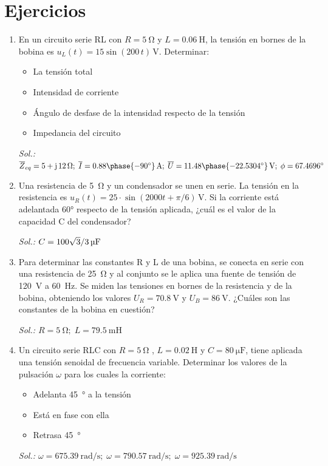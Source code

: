 \section*{Ejercicios}
	
\begin{enumerate}
		
\item En un circuito serie RL con $R=\qty{5}{\ohm}$ y $L=\qty{0.06}{\henry}$, la tensión en bornes de la bobina es $u_L(t)=15\sin(200\,t)\,\si{\volt}$. Determinar:
    \begin{itemize}
    \item La tensión total
    \item Intensidad de corriente
    \item Ángulo de desfase de la intensidad respecto de la tensión
    \item Impedancia del circuito
    \end{itemize}
  \emph{Sol.:\;
    $\overline{Z}_{eq}=5+\mathrm{j}\,12\,\si{\ohm};\;\overline{I}=0.88\phase{-90^\circ}\,\si{\ampere};\;\overline{U}=11.48\phase{-22.5304^\circ}\,\si{\volt};\; \phi=67.4696^\circ$}

\item Una resistencia de \qty{5}{\ohm} y un condensador se unen en serie. La tensión en la resistencia es $u_R(t) = 25 \cdot \sin(2000t + \pi/6)\,\si{\volt}$. Si la corriente está adelantada \ang{60} respecto de la tensión aplicada, ¿cuál es el valor de la capacidad C del condensador?

\emph{Sol.:\;
    $C = \SI[parse-numbers = false]{100\sqrt{3}/3}{\micro\farad}$}
  

\item Para determinar las constantes R y L de una bobina, se conecta en serie con una resistencia de \qty{25}{\ohm} y al conjunto se le aplica una fuente de tensión de \qty{120}{\volt} a \qty{60}{\hertz}. Se miden las tensiones en bornes de la resistencia y de la bobina, obteniendo los valores $U_R = \qty{70.8}{\volt}$ y $U_B = \qty{86}{\volt}$. ¿Cuáles son las constantes de la bobina en cuestión?

  \emph{Sol.:\; $R = \qty{5}{\ohm};\; L = \qty{79.5}{\milli\henry}$}

\item Un circuito serie RLC con $R = \qty{5}{\ohm}$ , $L = \qty{0.02}{\henry}$ y $C=\qty{80}{\micro\farad}$, tiene aplicada una tensión senoidal de frecuencia variable. Determinar los valores de la pulsación $\omega$ para los cuales la corriente:
    \begin{itemize}
    \item Adelanta \qty{45}{\degree} a la tensión
    \item Está en fase con ella
    \item Retrasa \qty{45}{\degree}
    \end{itemize}
  \emph{Sol.:\;
    $\omega=\qty{675.39}{\radian\per\second};\; \omega=\qty{790.57}{\radian\per\second};\;
    \omega=\qty{925.39}{\radian\per\second}$}


\end{enumerate}
